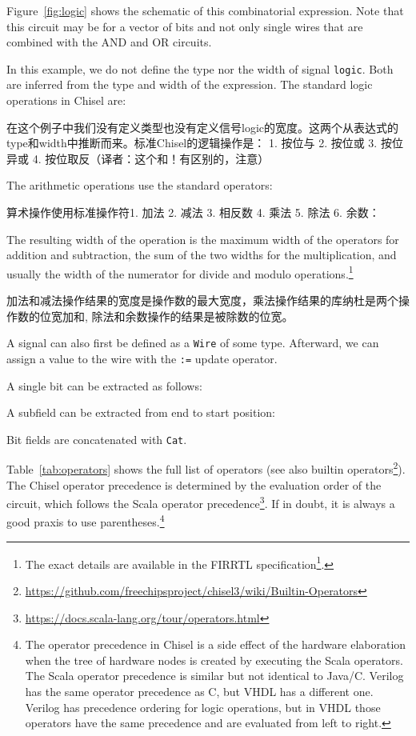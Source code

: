 \documentclass[%
    10pt,
    headinclude, footexclude,
    openright, %
    notitlepage,
    cleardoubleempty,
    headsepline,
    pointlessnumbers,
    bibtotoc, idxtotoc,
    ]{scrbook}
\newcommand{\code}[1]{{\small{\texttt{#1}}}}
\newcommand{\myref}[2]{\href{#1}{#2}}
\renewcommand{\myref}[2]{{#2}{\footnote{\url{#1}}}}
\begin{document}
Figure~\ref{fig:logic} shows the schematic of this combinatorial expression.
Note that this circuit may be for a vector of bits and not only single wires
that are combined with the AND and OR circuits.

In this example, we do not define the type nor the width of signal \code{logic}.
Both are inferred from the type and width of the expression.
The standard logic operations in Chisel are:


在这个例子中我们没有定义类型也没有定义信号logic的宽度。这两个从表达式的type和width中推断而来。标准Chisel的逻辑操作是：
1. 按位与
2. 按位或
3. 按位异或
4. 按位取反（译者：这个和！有区别的，注意）

\noindent The arithmetic operations use the standard operators:


算术操作使用标准操作符1. 加法 2. 减法 3. 相反数 4. 乘法 5. 除法 6. 余数：

\noindent The resulting width of the operation is the maximum width of the operators for
addition and subtraction, the sum of the two widths for the multiplication, and usually
the width of the numerator for divide and modulo operations.\footnote{The exact
details are available in the \myref{https://github.com/freechipsproject/firrtl/blob/master/spec/spec.pdf}{FIRRTL specification}.}

加法和减法操作结果的宽度是操作数的最大宽度，乘法操作结果的库纳杜是两个操作数的位宽加和, 除法和余数操作的结果是被除数的位宽。

A signal can also first be defined as a \code{Wire} of some type. Afterward, we can assign a
value to the wire with the \code{:=} update operator.


A single bit can be extracted as follows:

\noindent A subfield can be extracted from end to start position:

\noindent Bit fields are concatenated with \code{Cat}.

Table~\ref{tab:operators} shows the full list of operators
(see also \myref{https://github.com/freechipsproject/chisel3/wiki/Builtin-Operators}{builtin operators}).
The Chisel operator precedence is determined by the evaluation order of the circuit,
which follows the \myref{https://docs.scala-lang.org/tour/operators.html}{Scala operator precedence}.
If in doubt, it is always a good praxis to use parentheses.\footnote{The operator precedence in
Chisel is a side effect of the hardware elaboration when the tree of hardware nodes
is created by executing the Scala operators. The Scala operator precedence is similar but
not identical to Java/C. Verilog has the same operator precedence as C, but VHDL
has a different one. Verilog has precedence ordering for logic operations, but in VHDL
those operators have the same precedence and are evaluated from left to right.}
\end{document}
